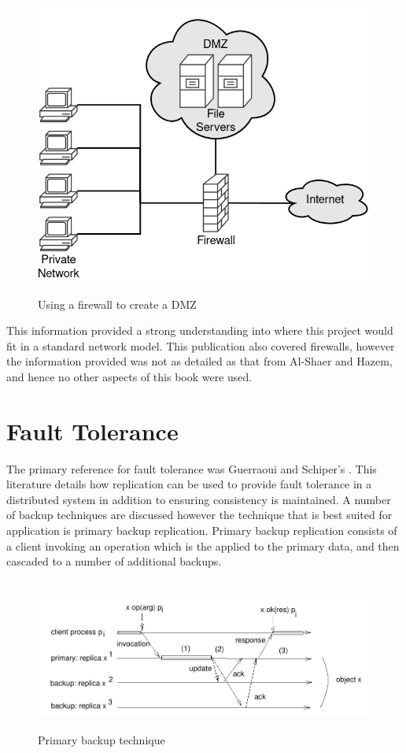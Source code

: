 \documentclass[a4paper, 11pt]{report}
\begin{document}
\begin{figure}[H]
\centering
\includegraphics[height=10cm,keepaspectratio]{DMZ}
\caption{Using a firewall to create a \acrshort{DMZ}}
\label{fig:dmz}
\end{figure}

This information provided a strong understanding into where this project would fit in a standard network model. This publication also covered firewalls, however the information provided was not as detailed as that from Al-Shaer and Hazem, and hence no other aspects of this book were used.

\section{Fault Tolerance}
The primary reference for fault tolerance was Guerraoui and Schiper's \cite{faulttol}. This literature details how replication can be used to provide fault tolerance in a distributed system in addition to ensuring consistency is maintained.  A number of backup techniques are discussed however the technique that is best suited for application is primary backup replication. Primary backup replication consists of a client invoking an operation which is the applied to the primary data, and then cascaded to a number of additional backups.

\begin{figure}[H]
\centering
\includegraphics[height=5cm,keepaspectratio]{primback}
\caption{Primary backup technique \cite{faulttol}} 
\label{fig:backup}
\end{figure}
\end{document}
